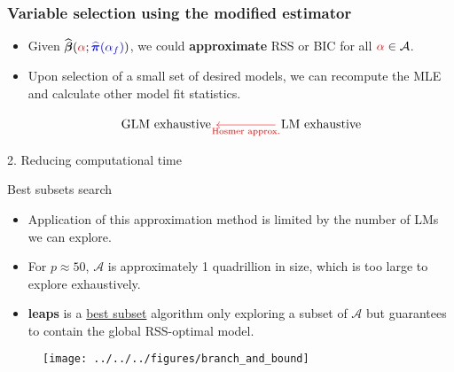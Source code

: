 \documentclass[12pt,aspectratio=169]{beamer}
\newcommand{\bbetaHat}{\widehat{\boldsymbol{\beta}}}
\newcommand{\bPiHat}{\widehat{\boldsymbol{\pi}}}
\newcommand{\alphaFull}{\alpha_{f}}
\begin{document}
\begin{frame}[fragile] %
	\frametitle{Variable selection using the modified estimator}
	\begin{itemize}
		\item Given $ \bbetaHat({\color{red}\alpha}; {\color{blue}\bPiHat(\alphaFull)}) $, we could \textbf{approximate} RSS or BIC for all $ {\color{red}\alpha} \in \mathcal{A} $. 
		
		\item Upon selection of a small set of desired models, we can recompute the MLE and calculate other model fit statistics. 
		

\vspace{0.5cm}
\begin{equation*}
\begin{tikzcd}[column sep=huge]
\text{GLM exhaustive}
& \arrow[l, red, "\text{Hosmer approx.}", red] \text{LM exhaustive}
\end{tikzcd}
\end{equation*}

\end{itemize}

\end{frame}



\begin{frame}
\Huge{\color{themeBlue} 2. Reducing computational time}
\end{frame}


\begin{frame}{Best subsets search}
	\begin{itemize}
		
		\item Application of this approximation method is limited by the number of LMs we can explore.
		
		\item For $ p \approx 50 $, $ \mathcal{A}$ is approximately 1 quadrillion in size, which is too large to explore exhaustively. 
		
		\item \textbf{leaps} \citep{Furnival1974, Lumley2017} is a \underline{best subset} algorithm only exploring a subset of $ \mathcal{A} $ but guarantees to contain the global RSS-optimal model.
	\end{itemize}

\begin{figure}
	\centering
	\texttt{[image: ../../../figures/branch\_and\_bound]}
	\label{fig:branchandbound}
\end{figure}
\end{frame}
\end{document}
